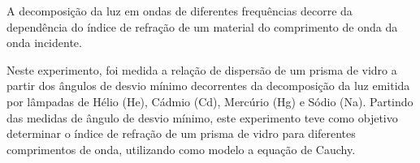 A decomposição da luz em ondas de diferentes frequências decorre da dependência do índice de refração de um material do comprimento de onda da onda incidente. 

Neste experimento, foi medida a relação de dispersão de um prisma de vidro a partir dos ângulos de desvio mínimo decorrentes da decomposição da luz emitida por lâmpadas de Hélio (He), Cádmio (Cd), Mercúrio (Hg) e Sódio (Na). Partindo das medidas de ângulo de desvio mínimo, este experimento teve como objetivo determinar o índice de refração de um prisma de vidro para diferentes comprimentos de onda, utilizando como modelo a equação de Cauchy.



